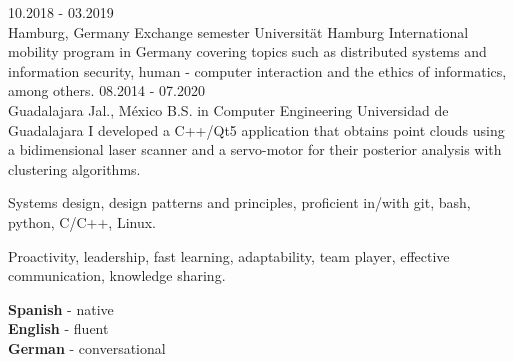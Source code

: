 \documentclass[9pt]{developercv} %
\begin{document}


\begin{entrylist}
	\entry
    {10.2018 - 03.2019\\\footnotesize{Hamburg, Germany}}
    {Exchange semester}
    {Universität Hamburg}
		{International mobility program in Germany covering topics such as distributed systems and information security, human - computer interaction and the ethics of informatics, among others.}
	\entry
    {08.2014 - 07.2020\\\footnotesize{Guadalajara Jal., México}}
    {B.S. in Computer Engineering}
    {Universidad de Guadalajara}
		{I developed a C++/Qt5 application that obtains point clouds using a bidimensional laser scanner and a servo-motor for their posterior analysis with clustering algorithms.}
\end{entrylist}


\begin{minipage}[t]{0.3\textwidth} %
	\vspace{-\baselineskip} %
	
	
	Systems design, design patterns and principles, proficient in/with git, bash, python, C/C++, Linux.
\end{minipage}
\hfill %
\begin{minipage}[t]{0.3\textwidth} %
	\vspace{-\baselineskip} %
	
	
    Proactivity, leadership, fast learning, adaptability, team player, effective communication, knowledge sharing.
\end{minipage}
\hfill %
\begin{minipage}[t]{0.3\textwidth} %
	\vspace{-\baselineskip} %

	
	\textbf{Spanish} - native\\
	\textbf{English} - fluent\\
	\textbf{German} - conversational\\
\end{minipage}

\end{document}
